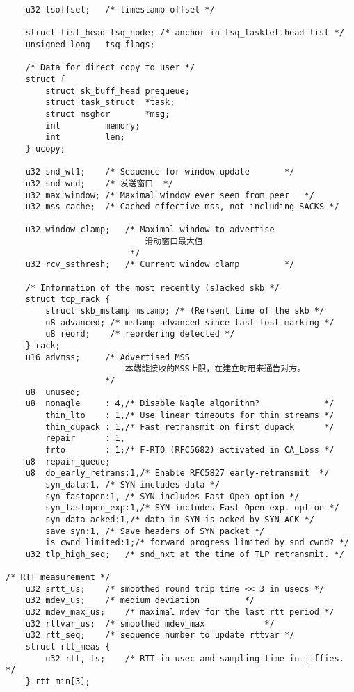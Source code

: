 \begin{verbatim}
    u32 tsoffset;   /* timestamp offset */

    struct list_head tsq_node; /* anchor in tsq_tasklet.head list */
    unsigned long   tsq_flags;

    /* Data for direct copy to user */
    struct {
        struct sk_buff_head prequeue;
        struct task_struct  *task;
        struct msghdr       *msg;
        int         memory;
        int         len;
    } ucopy;

    u32 snd_wl1;    /* Sequence for window update       */
    u32 snd_wnd;    /* 发送窗口  */
    u32 max_window; /* Maximal window ever seen from peer   */
    u32 mss_cache;  /* Cached effective mss, not including SACKS */

    u32 window_clamp;   /* Maximal window to advertise     
							滑动窗口最大值					   
						 */
    u32 rcv_ssthresh;   /* Current window clamp         */

    /* Information of the most recently (s)acked skb */
    struct tcp_rack {
        struct skb_mstamp mstamp; /* (Re)sent time of the skb */
        u8 advanced; /* mstamp advanced since last lost marking */
        u8 reord;    /* reordering detected */
    } rack;
    u16 advmss;     /* Advertised MSS           
						本端能接收的MSS上限，在建立时用来通告对方。					
					*/
    u8  unused;
    u8  nonagle     : 4,/* Disable Nagle algorithm?             */
        thin_lto    : 1,/* Use linear timeouts for thin streams */
        thin_dupack : 1,/* Fast retransmit on first dupack      */
        repair      : 1,
        frto        : 1;/* F-RTO (RFC5682) activated in CA_Loss */
    u8  repair_queue;
    u8  do_early_retrans:1,/* Enable RFC5827 early-retransmit  */
        syn_data:1, /* SYN includes data */
        syn_fastopen:1, /* SYN includes Fast Open option */
        syn_fastopen_exp:1,/* SYN includes Fast Open exp. option */
        syn_data_acked:1,/* data in SYN is acked by SYN-ACK */
        save_syn:1, /* Save headers of SYN packet */
        is_cwnd_limited:1;/* forward progress limited by snd_cwnd? */
    u32 tlp_high_seq;   /* snd_nxt at the time of TLP retransmit. */

/* RTT measurement */
    u32 srtt_us;    /* smoothed round trip time << 3 in usecs */
    u32 mdev_us;    /* medium deviation         */
    u32 mdev_max_us;    /* maximal mdev for the last rtt period */
    u32 rttvar_us;  /* smoothed mdev_max            */
    u32 rtt_seq;    /* sequence number to update rttvar */
    struct rtt_meas {
        u32 rtt, ts;    /* RTT in usec and sampling time in jiffies. */
    } rtt_min[3];


\end{verbatim}
